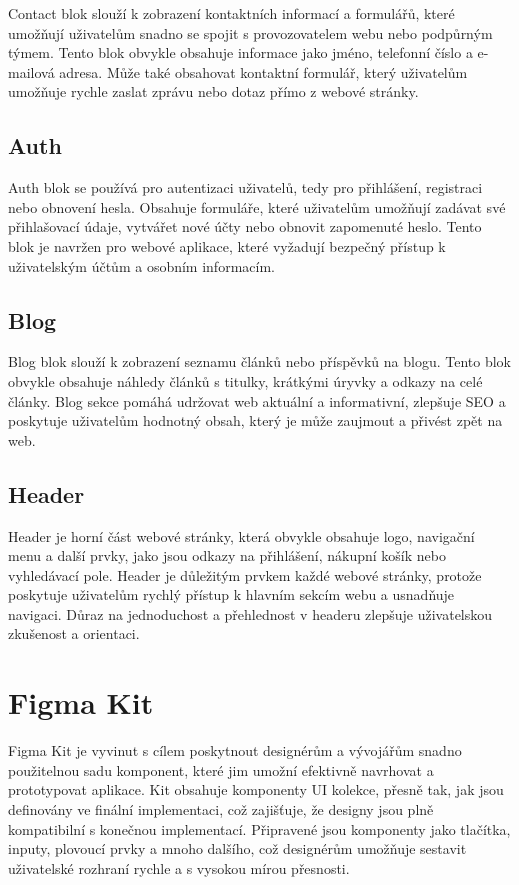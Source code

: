 Contact blok slouží k zobrazení kontaktních informací a formulářů, které umožňují uživatelům snadno se spojit s provozovatelem webu nebo podpůrným týmem. Tento blok obvykle obsahuje informace jako jméno, telefonní číslo a e-mailová adresa. Může také obsahovat kontaktní formulář, který uživatelům umožňuje rychle zaslat zprávu nebo dotaz přímo z webové stránky.

\subsection{Auth}

Auth blok se používá pro autentizaci uživatelů, tedy pro přihlášení, registraci nebo obnovení hesla. Obsahuje formuláře, které uživatelům umožňují zadávat své přihlašovací údaje, vytvářet nové účty nebo obnovit zapomenuté heslo. Tento blok je navržen pro webové aplikace, které vyžadují bezpečný přístup k uživatelským účtům a osobním informacím.

\subsection{Blog}

Blog blok slouží k zobrazení seznamu článků nebo příspěvků na blogu. Tento blok obvykle obsahuje náhledy článků s titulky, krátkými úryvky a odkazy na celé články. Blog sekce pomáhá udržovat web aktuální a informativní, zlepšuje SEO a poskytuje uživatelům hodnotný obsah, který je může zaujmout a přivést zpět na web.

\subsection{Header}

Header je horní část webové stránky, která obvykle obsahuje logo, navigační menu a další prvky, jako jsou odkazy na přihlášení, nákupní košík nebo vyhledávací pole. Header je důležitým prvkem každé webové stránky, protože poskytuje uživatelům rychlý přístup k hlavním sekcím webu a usnadňuje navigaci. Důraz na jednoduchost a přehlednost v headeru zlepšuje uživatelskou zkušenost a orientaci.

\section{Figma Kit}
Figma Kit je vyvinut s cílem poskytnout designérům a vývojářům snadno použitelnou sadu komponent, které jim umožní efektivně navrhovat a prototypovat aplikace. Kit obsahuje komponenty UI kolekce, přesně tak, jak jsou definovány ve finální implementaci, což zajišťuje, že designy jsou plně kompatibilní s konečnou implementací. Připravené jsou komponenty jako tlačítka, inputy, plovoucí prvky a mnoho dalšího, což designérům umožňuje sestavit uživatelské rozhraní rychle a s vysokou mírou přesnosti.


